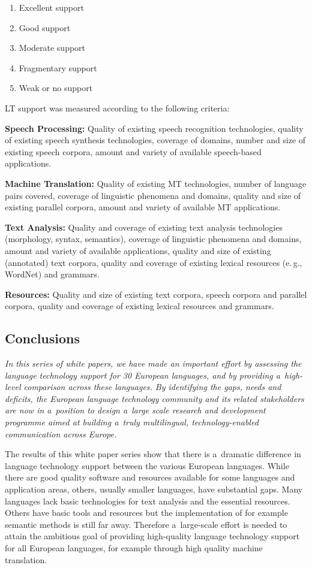 \begin{multicols}{2}
\begin{enumerate} \item Excellent support \item Good support \item
Moderate support \item Fragmentary support \item Weak or no support
\end{enumerate} 

LT support was measured according to the following criteria: 

\textbf{Speech Processing:} Quality of existing speech recognition
technologies, quality of existing speech synthesis technologies,
coverage of domains, number and size of existing speech corpora,
amount and variety of available speech-based applications. 

\textbf{Machine Translation:} Quality of existing MT technologies,
number of language pairs covered, coverage of linguistic phenomena and
domains, quality and size of existing parallel corpora, amount and
variety of available MT applications. 

\textbf{Text Analysis:} Quality and coverage of existing text analysis
technologies (morphology, syntax, semantics), coverage of linguistic
phenomena and domains, amount and variety of available applications,
quality and size of existing (annotated) text corpora, quality and
coverage of existing lexical resources (e.\,g., WordNet) and
grammars. 

\textbf{Resources:} Quality and size of existing text corpora, speech
corpora and parallel corpora, quality and coverage of existing lexical
resources and grammars. 

\subsection{Conclusions} 

\emph{In this series of white papers, we have made an important effort
by assessing the language technology support for 30 European
languages, and by providing a~high-level comparison across these
languages. By identifying the gaps, needs and deficits, the European
language technology community and its related stakeholders are now in
a~position to design a~large scale research and development programme
aimed at building a~truly multilingual, technology-enabled
communication across Europe.} 

The results of this white paper series show that there is a~dramatic
difference in language technology support between the various European
languages. While there are good quality software and resources
available for some languages and application areas, others, usually
smaller languages, have substantial gaps. Many languages lack basic
technologies for text analysis and the essential resources. Others
have basic tools and resources but the implementation of for example
semantic methods is still far away. Therefore a~large-scale effort is
needed to attain the ambitious goal of providing high-quality language
technology support for all European languages, for example through
high quality machine translation. 


\end{multicols}
